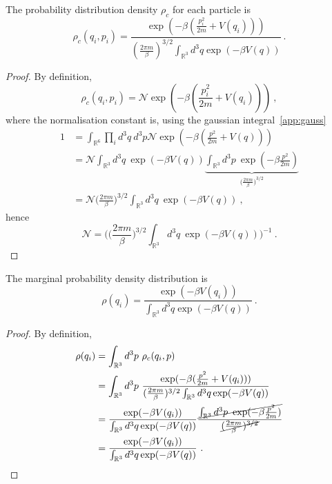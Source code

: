     The probability distribution density $\rho_c$ for each particle is 
    \begin{equation*}
        \rho_c (q_i, p_i) = \frac{\exp (- \beta ( \frac{p^2_i}{2m} + V(q_i) ))}{(\frac{2\pi m}{\beta})^{3/2} \int_{\mathbb R^3} d^3 q \exp(- \beta V(q))} ~.
    \end{equation*}
    \begin{proof}
        By definition, 
        \begin{equation*}
            \rho_c (q_i, p_i) = \mathcal N \exp (- \beta ( \frac{p^2_i}{2m} + V(q_i) )) ~,
        \end{equation*}
        where the normalisation constant is, using the gaussian integral~\eqref{app:gauss} 
        \begin{equation*}
        \begin{aligned}
            1 & = \int_{\mathbb R^6} \prod_i d^3 q ~ d^3 p \mathcal N \exp(- \beta ( \frac{p^2}{2m} + V(q))) \\ & = \mathcal N \int_{\mathbb R^3} d^3 q ~ \exp(- \beta V(q))  \underbrace{\int_{\mathbb R^3} d^3 p ~ \exp(- \beta \frac{p^2}{2m})}_{\Big ( \frac{2\pi m}{\beta}\Big)^{3/2}} \\ & = \mathcal N  \Big ( \frac{2\pi m}{\beta}\Big)^{3/2} \int_{\mathbb R^3} d^3 q ~ \exp(- \beta V(q)) ~,
        \end{aligned}
        \end{equation*}
        hence 
        \begin{equation*}
            \mathcal N = \Big ( \Big ( \frac{2\pi m}{\beta}\Big)^{3/2} \int_{\mathbb R^3} d^3 q ~ \exp(- \beta V(q))  \Big )^{-1} ~.
        \end{equation*}
    \end{proof}

    The marginal probability density distribution is 
    \begin{equation*}
        \rho(q_i) = \frac{\exp (- \beta V(q_i) )}{\int_{\mathbb R^3} d^3 q \exp(- \beta V(q))} ~.
    \end{equation*}
    \begin{proof}
        By definition, 
        \begin{equation*}
        \begin{aligned}
            \rho(q_i) & = \int_{\mathbb R^3} d^3 p ~ \rho_c (q_i, p) \\ & = \int_{\mathbb R^3} d^3 p ~ \frac{\exp (- \beta ( \frac{p^2}{2m} + V(q_i) ))}{(\frac{2\pi m}{\beta})^{3/2} \int_{\mathbb R^3} d^3 q \exp(- \beta V(q))} \\ & = \frac{\exp (- \beta V(q_i) )}{\int_{\mathbb R^3} d^3 q \exp(- \beta V(q))} \frac{\cancel{\int_{\mathbb R^3} d^3 p ~ \exp(- \beta \frac{p^2}{2m})}}{\cancel{(\frac{2\pi m}{\beta})^{3/2}}} \\ & = \frac{\exp (- \beta V(q_i) )}{\int_{\mathbb R^3} d^3 q \exp(- \beta V(q))} ~.
        \end{aligned}
        \end{equation*}
    \end{proof}

